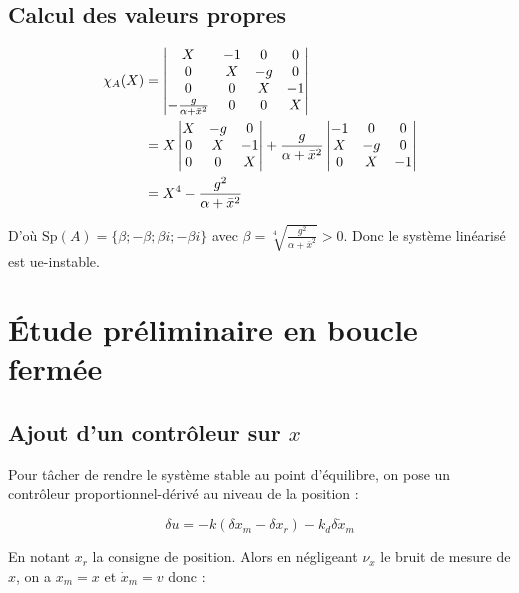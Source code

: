 \documentclass[10pt]{article}
\begin{document}
\subsection*{Calcul des valeurs propres}

\begin{align}
	\chi_A (X) &=
	\begin{vmatrix}
		X & -1 & 0 & 0 \\
		0 & X & -g & 0 \\
		0 & 0 & X & -1 \\
		- \frac{g}{\alpha + \bar x^2} & 0 & 0 & X
	\end{vmatrix} \notag \\
	&= X \begin{vmatrix}
		X & -g & 0 \\
		0 & X & -1 \\
		0 & 0 & X
	\end{vmatrix} + 
	\frac{g}{\alpha + \bar x^2} \begin{vmatrix}
		-1 & 0 & 0 \\
		X & -g & 0 \\
		0 & X & -1
	\end{vmatrix} \notag \\
	&= X^4 - \frac{g^2}{\alpha + \bar x^2} \notag
\end{align}

\noindent D'où $\mathrm{Sp} \left( A \right) = \{ \beta ; - \beta ; \beta i ; - \beta i\}$ avec
$\beta =  \sqrt[4]{\frac{g^2}{\alpha + \bar x^2}}  > 0$. Donc le système linéarisé est ue-instable.

\section{Étude préliminaire en boucle fermée}

\subsection*{Ajout d'un contrôleur sur $x$}

Pour tâcher de rendre le système stable au point d'équilibre, on pose un contrôleur proportionnel-dérivé
au niveau de la position :

\[
	\delta u = - k ( \delta x_m - \delta x_r ) - k_d \delta \dot x_m
\]

\noindent En notant $x_r$ la consigne de position. Alors en négligeant $\nu_x$ le bruit de mesure de $x$,
on a $x_m = x$ et $\dot x_m = v$ donc :
\end{document}
